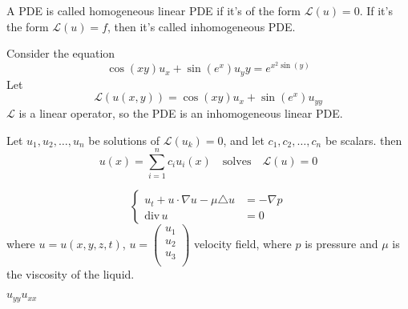 \begin{definition}
	A PDE is called homogeneous linear PDE if it's of the form $\mathscr L(u) = 0$. If it's the form $\mathscr L(u) = f$, then it's called inhomogeneous PDE.
\end{definition} 
\begin{example}
	Consider the equation
	\[ \cos(xy) u_x + \sin \left( e^x \right) u_yy = e^{x^2\sin (y)} \]
	Let 
	\[ \mathscr L(u(x,y)) = \cos(xy) u_x + \sin \left( e^x \right) u_{yy} \]
	$\mathscr L$ is a linear operator, so the PDE is an inhomogeneous linear PDE.
\end{example}
\begin{theorem}
	Let $u_1, u_2, \ldots, u_n$ be solutions of $\mathscr L(u_k) = 0$, and let $c_1, c_2, \ldots, c_n$ be scalars. then
	\[ u(x) = \sum_{i = 1}^{n} c_i u_i(x) \quad \mathrm{ solves } \quad \mathscr L(u) = 0\]
\end{theorem}
\begin{example}
	\[ \left\{\begin{array}{rl}
		u_t + u \cdot \nabla u - \mu \triangle u &= - \nabla p \\
		\mathrm{div}\, u	&= 0 \end{array} \right.\]
		where $u = u(x,y,z,t)$, $u = \begin{pmatrix}
			u_1 \\
			u_2 \\
			u_3 \\
		\end{pmatrix}$ velocity field, where $p$ is pressure and $\mu$ is the viscosity of the liquid.
\end{example}
$u_{yy} u_{xx} $